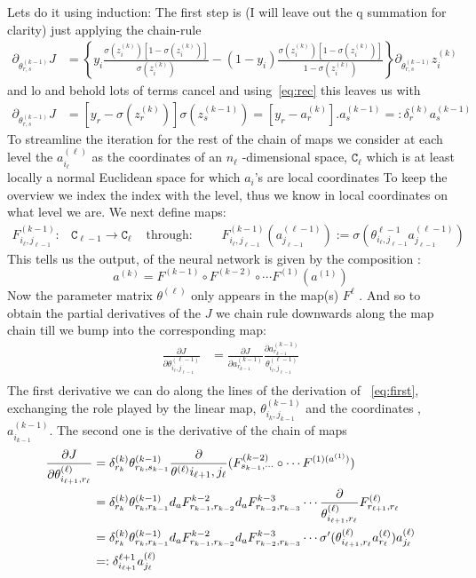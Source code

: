 \documentclass[a4paper,10pt]{article}
\newcommand{\tet}[3]{\theta^{({#1-1})} _{{#2}_{{#1}},{#3}_{{#1-1} }}}
\newcommand{\aet}[2]{a^{({#1})} _{{#2}_{{#1}} }}
\newcommand{\delt}[2]{\delta^{({#1})} _{{#2}_{{#1}}}}
\begin{document}
Lets do it using induction:
The first step is (I will leave out the q summation for clarity) just applying the chain-rule
\begin{align}
  \partial_{\theta^{(k-1)}_{r,s}} J & =\left\{ y_i \frac{\sigma(z^{(k)}_i)[1-\sigma(z^{(k)}_i)]}{\sigma(z^{(k)}_i)}  -(1-y_i) \frac{\sigma(z^{(k)}_i)[1-\sigma(z^{(k)}_i)]}{1-\sigma(z^{(k)}_i)}  \right\} \partial_{\theta^{(k-1)}_{r,s}}z^{(k)}_i
\end{align}
and lo and behold lots of terms cancel and using~\eqref{eq:rec} this leaves us with
\begin{align}
   \partial_{\theta^{(k-1)}_{r,s}} J & =[ y_r - \sigma(z_r^{(k)})]   \sigma(z_s^{(k-1)})  =[y_r - a^{(k)}_r]. a^{(k-1)}_s=:\delta_r^{(k)} a^{(k-1)}_s
\end{align}\label{eq:first}
To streamline the iteration for the rest of the chain of maps we consider at each level the $a_{i_{\ell}}^{(\ell)}$ as the coordinates of an $n_{\ell}$ -dimensional space, $\mathtt{C}_{\ell}$ which is at least locally  a normal  Euclidean space for which $a_i$'s are local coordinates
To keep the overview we index the index with the level, thus we know in local coordinates on what level we are. We next define maps:
\begin{align*}
  F^{(k-1)}_{i_{\ell},j_{\ell-1}}: &\mathtt{C}_{\ell-1}\rightarrow \mathtt{C}_{\ell} &\text{ through:  }\qquad F^{(k-1)}_{i_{\ell},j_{\ell-1}} (a^{(\ell-1)}_{j_{\ell-1}}) := \sigma(\theta^{\ell-1}_{i_{\ell},j_{\ell-1}}a^{(\ell-1)}_{j_{\ell-1}})
\end{align*}
This tells us the output,  of the neural network is given by the composition :  
$$a^{(k)} =F^{(k-1)} \circ F^{(k-2)} \circ \cdots F^{(1)}(a^{(1)})$$
Now the parameter matrix  $\theta^{(\ell)}$ only appears in the map(s) $F^{\ell}$ . And so to obtain the partial derivatives of the $J$ we chain rule downwards along the map chain till we bump into the corresponding map:
\begin{align}
 \frac{\partial J}{\partial \tet{\ell}{ i}{ j}} &= \frac{\partial{J}}{\partial \aet{k-1}{r}}\frac{\partial \aet{k-1}{r}}{\tet{\ell}{ i}{ j}} \\
\end{align}
The first derivative we can do along the lines of the derivation of ~\eqref{eq:first}, exchanging the role played by the linear map, $\tet{k}{i}{j}$ and the coordinates ,$\aet{k-1}{i}$. The second one is the derivative of the chain of maps
\begin{align}
  \frac{\partial J}{\partial \theta^{(\ell)}_{i_{\ell +1},r_{\ell}}}  &=\delt{k}{r}\tet{k}{r}{s}\frac{\partial}{\theta^{(\ell)}{ i_{\ell+1}, j_{\ell}}}( F^{(k-2)}_{s_{k-1},{\cdots}}\circ\cdots F^{(1)(a^{(1)})})\notag\\
      &=\delt{k}{r}\tet{k}{r}{r} d_aF^{k-2}_{r_{k-1},r_{k-2}}d_aF^{k-3}_{r_{k-2},r_{k-3}}\cdots   \frac{\partial}{\theta^{(\ell)}_{i_{\ell +1},r_{\ell}} } F^{(\ell)}_{r_{\ell+1}, r_{\ell}} \notag\\
      &=\delt{k}{r}\tet{k}{r}{r} d_aF^{k-2}_{r_{k-1},r_{k-2}}d_aF^{k-3}_{r_{k-2},r_{k-3}}\cdots  \sigma'(\theta^{(\ell)}_{i_{\ell +1},r_{\ell}}  \aet{\ell}{r})  \aet{\ell}{j}\notag\\
      & =: \delta^{\ell+1}_{i_{\ell+1}} \aet{\ell}{j}
\end{align}
\end{document}
